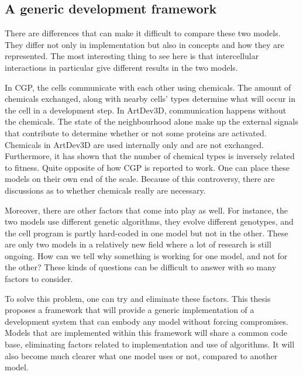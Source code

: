 \subsection{A generic development framework}
There are differences that can make it difficult to compare these two models. They differ not only in implementation but also in concepts and how they are represented. The most interesting thing to see here is that intercellular interactions in particular give different results in the two models.

In CGP, the cells communicate with each other using chemicals. The amount of chemicals exchanged, along with nearby cells' types determine what will occur in the cell in a development step. In ArtDev3D, communication happens without the chemicals. The state of the neighbourhood alone make up the external signals that contribute to determine whether or not some proteins are activated. Chemicals in ArtDev3D are used internally only and are not exchanged. Furthermore, it has shown that the number of chemical types is inversely related to fitness. Quite opposite of how CGP is reported to work. One can place these models on their own end of the scale. Because of this controversy, there are discussions as to whether chemicals really are necessary.

Moreover, there are other factors that come into play as well. For instance, the two models use different genetic algorithms, they evolve different genotypes, and the cell program is partly hard-coded in one model but not in the other. These are only two models in a relatively new field where a lot of research is still ongoing. How can we tell why something is working for one model, and not for the other? These kinds of questions can be difficult to answer with so many factors to consider.

To solve this problem, one can try and eliminate these factors. This thesis proposes a framework that will provide a generic implementation of a development system that can embody any model without forcing compromises. Models that are implemented within this framework will share a common code base, eliminating factors related to implementation and use of algorithms. It will also become much clearer what one model uses or not, compared to another model.


